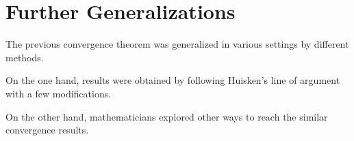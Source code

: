 \section{Further Generalizations}

The previous convergence theorem was generalized in various settings by different methods.

On the one hand, results were obtained by following Huisken's line of argument with a few modifications. 

On the other hand, mathematicians explored other ways to reach the similar convergence results.




\chapterend

